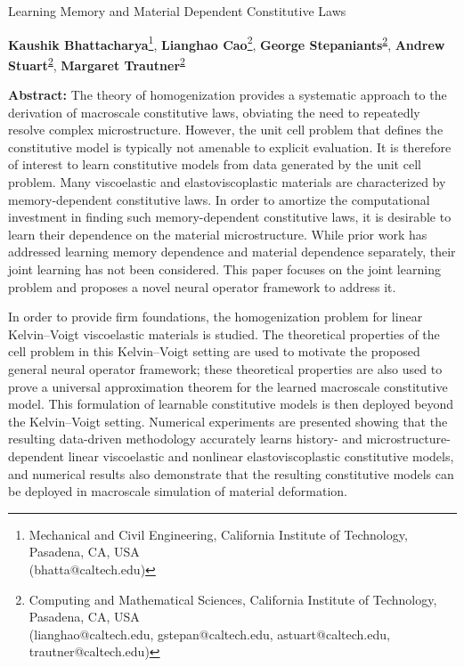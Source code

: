 \documentclass[letterpaper,11pt]{article}
\begin{document}
\begin{minipage}{6.4in}
  \medskip
  \bigskip
  \begin{center}
    {\Large Learning Memory and Material Dependent Constitutive Laws} \\[3mm]
  \end{center}
\end{minipage}
\medskip
\begin{center}
\textbf{Kaushik Bhattacharya}\footnote{Mechanical and Civil Engineering, California Institute of Technology, Pasadena, CA, USA \\ \indent\indent (bhatta@caltech.edu)}, 
\textbf{Lianghao Cao}\footnote{\label{cms}Computing and Mathematical Sciences, California Institute of Technology, Pasadena, CA, USA \\ \indent\indent (lianghao@caltech.edu, gstepan@caltech.edu, astuart@caltech.edu, trautner@caltech.edu)},
\textbf{George Stepaniants}\textsuperscript{{\ref{cms}}},
\textbf{Andrew Stuart}\textsuperscript{{\ref{cms}}},
\textbf{Margaret Trautner}\textsuperscript{{\ref{cms}}}
\end{center}
\medskip

\textbf{Abstract:} The theory of homogenization provides a systematic approach to the derivation of macroscale constitutive laws, obviating the need to repeatedly resolve complex microstructure. However, the unit cell problem that defines the constitutive model is typically not amenable to explicit evaluation. It is therefore of interest to learn constitutive models from data generated by the unit cell problem. Many viscoelastic and elastoviscoplastic materials are characterized by memory-dependent constitutive laws. In order to amortize the computational investment in finding such memory-dependent constitutive laws, it is desirable to learn their dependence on the material microstructure. While prior work has addressed learning memory dependence and material dependence separately, their joint learning has not been considered. This paper focuses on the joint learning problem and proposes a novel neural operator framework to address it.

In order to provide firm foundations, the homogenization problem for linear Kelvin--Voigt viscoelastic materials is studied. The theoretical properties of the cell problem in this Kelvin--Voigt setting are used to motivate the proposed general neural operator framework; these theoretical properties are also used to prove a universal approximation theorem for the learned macroscale constitutive model. This formulation of learnable constitutive models is then deployed beyond the Kelvin--Voigt setting. Numerical experiments are presented showing that the resulting data-driven methodology accurately learns history- and microstructure-dependent linear viscoelastic and nonlinear elastoviscoplastic constitutive models, and numerical results also demonstrate that the resulting constitutive models can be deployed in macroscale simulation of material deformation.
\end{document}
